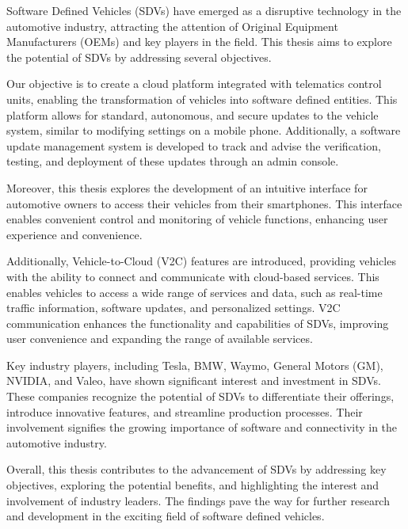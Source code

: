 \documentclass[
12pt,
oneside, 
onehalfspacing, 
nolistspacing, 
parskip, 
chapterinoneline, 
]{AASTCOMPUTER}
\begin{document}
\cleardoublepage



\begin{abstractp}
Software Defined Vehicles (SDVs) have emerged as a disruptive technology in the automotive industry, attracting the attention of Original Equipment Manufacturers (OEMs) and key players in the field. This thesis aims to explore the potential of SDVs by addressing several objectives.

Our objective is to create a cloud platform integrated with telematics control units, enabling the transformation of vehicles into software defined entities. This platform allows for standard, autonomous, and secure updates to the vehicle system, similar to modifying settings on a mobile phone. Additionally, a software update management system is developed to track and advise the verification, testing, and deployment of these updates through an admin console.

Moreover, this thesis explores the development of an intuitive interface for automotive owners to access their vehicles from their smartphones. This interface enables convenient control and monitoring of vehicle functions, enhancing user experience and convenience.

Additionally, Vehicle-to-Cloud (V2C) features are introduced, providing vehicles with the ability to connect and communicate with cloud-based services. This enables vehicles to access a wide range of services and data, such as real-time traffic information, software updates, and personalized settings. V2C communication enhances the functionality and capabilities of SDVs, improving user convenience and expanding the range of available services.

Key industry players, including Tesla, BMW, Waymo, General Motors (GM), NVIDIA, and Valeo, have shown significant interest and investment in SDVs. These companies recognize the potential of SDVs to differentiate their offerings, introduce innovative features, and streamline production processes. Their involvement signifies the growing importance of software and connectivity in the automotive industry.

Overall, this thesis contributes to the advancement of SDVs by addressing key objectives, exploring the potential benefits, and highlighting the interest and involvement of industry leaders. The findings pave the way for further research and development in the exciting field of software defined vehicles.
\end{abstractp}
\end{document}
